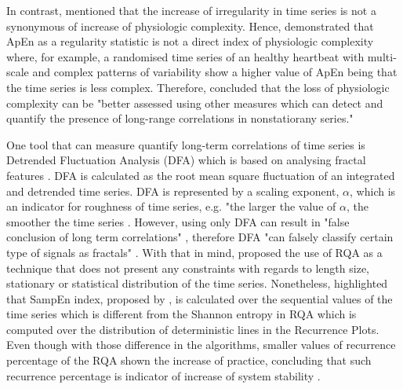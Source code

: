 In contrast, \cite{goldberger1996} mentioned  that the increase of 
irregularity in time series is not a synonymous of increase of physiologic complexity.
Hence, \cite{goldberger2002b} demonstrated that 
ApEn as a regularity statistic is not a direct index of physiologic complexity
where, for example, a randomised time series of an healthy heartbeat with multi-scale
and complex patterns of variability show a higher value of ApEn
being that the time series is less complex.
Therefore, \citealt[p. 24]{goldberger2002b} concluded that the loss of 
physiologic complexity can be "better assessed using other measures which
can detect and quantify the presence of long-range correlations in nonstatiorany series."


One tool that can measure quantify long-term correlations of 
time series is Detrended Fluctuation Analysis (DFA) which is based 
on analysing fractal features \cite{peng1995}.
DFA is calculated as the root mean square fluctuation of an integrated 
and detrended time series. DFA is represented by a scaling exponent, $\alpha$,
which is an indicator for roughness of time series,
e.g. "the larger the value of $\alpha$, the smoother the time series \cite{peng1995}.
However, using only DFA can result in  "false conclusion of long term correlations" 
\cite[p. 5001]{rangarajan2000}, therefore DFA "can falsely classify certain 
type of signals as fractals" \cite[p. 80]{wijnants2009}.
With that in mind, \cite{wijnants2009} proposed the use of RQA as a technique
that does not present any constraints with regards to length size,
stationary or statistical distribution of the time series.
Nonetheless, \cite{wijnants2009} highlighted that  SampEn index, proposed by \cite{richman2000},
is calculated over the sequential values of the time series which is different 
from the Shannon entropy in RQA which is computed over the distribution 
of deterministic lines in the Recurrence Plots.
Even though  with those difference in the algorithms, smaller values of recurrence 
percentage of the RQA shown the increase of practice,
concluding that such recurrence percentage is indicator of increase
of system stability \citep{wijnants2009}.



